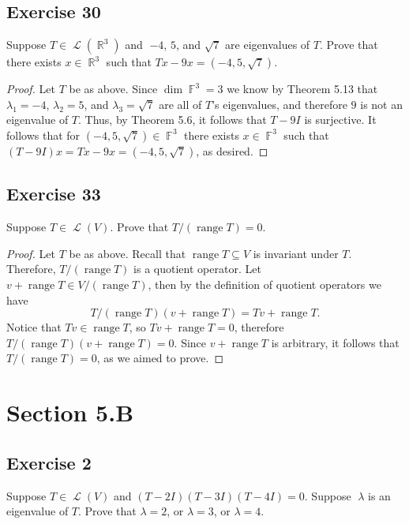 \documentclass[letterpaper, 12pt]{amsart}
\DeclareMathOperator{\R}{\mathbb{R}}				%
\DeclareMathOperator{\F}{\mathbb{F}}				%
\DeclareMathOperator{\Ell}{\mathscr{L}}				%
\DeclareMathOperator{\range}{\text{range }}			%
\theoremstyle{definition}  							%
\begin{document}
		\subsection*{Exercise 30}
		Suppose $T \in \Ell(\R^{3})$ and 􏰋$-4$, $5$, and $\sqrt{7}$ are eigenvalues of $T$.
		Prove that there exists $x \in \R^{3}$ such that $Tx - 9x = (-4, 5, \sqrt{7})$.

		\begin{proof}
		Let $T$ be as above.
		Since $\dim \F^{3} = 3$ we know by Theorem 5.13 that $\lambda_{1} = -4$, $\lambda_{2} = 5$, and $\lambda_{3} = \sqrt{7}$ are all of $T$'s eigenvalues, and therefore $9$ is not an eigenvalue of $T$.
		Thus, by Theorem 5.6, it follows that $T - 9I$ is surjective.
		It follows that for $(-4, 5, \sqrt{7}) \in \F^3$ there exists $x \in \F^3$ such that $(T-9I)x = Tx - 9x = (-4, 5, \sqrt{7})$, as desired.
		\end{proof}

		\subsection*{Exercise 33}
		Suppose $T \in \Ell(V)$.
		Prove that $T/(\range T) = 0$.

		\begin{proof}
		Let $T$ be as above.
		Recall that $\range T \subseteq V$ is invariant under $T$.
		Therefore, $T/(\range T)$ is a quotient operator.
		Let $v + \range T \in V/(\range T)$, then by the definition of quotient operators we have $$T/(\range T)(v + \range T) = Tv + \range T.$$
		Notice that $Tv \in \range T$, so $Tv + \range T = 0$, therefore $T/(\range T)(v + \range T) = 0$.
		Since $v + \range T$ is arbitrary, it follows that $T/(\range T) = 0$, as we aimed to prove.
		\end{proof}

	\section*{Section 5.B}
		\subsection*{Exercise 2}
		Suppose $T \in \Ell(V)$ and $(T - 2I)(T - 3I)(T - 4I) = 0$.
		Suppose􏰀 $\lambda$ is an eigenvalue of $T$. 
		Prove that $\lambda = 2$, or $\lambda = 3$, or $\lambda = 4$.
\end{document}
